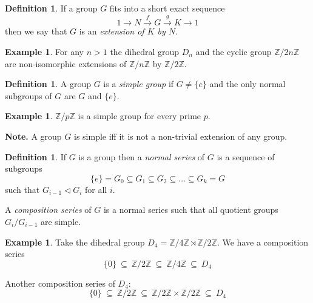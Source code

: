 \documentclass[12pt, letterpaper, oneside]{article}
\theoremstyle{plain}
\theoremstyle{definition}
\newtheorem{definition}[theorem]{Definition}
\newtheorem{example}[theorem]{Example}
\newcommand{\lra}{\longrightarrow}
\newcommand{\Z}{{\mathbb Z}}
\newcommand{\vs}{\vskip 5mm}
\begin{document}
\vs\vs 

\begin{definition}
If a group $G$ fits into a short exact sequence 
$$ 1\lra N \overset{f}{\lra} G \overset{g}{\lra} K \lra 1$$
then we say that $G$ is an \emph{extension of $K$ by $N$}.
\end{definition}


\vs\vs

\begin{example}
For any $n>1$ the dihedral group $D_{n}$ and the cyclic group $\Z/2n\Z$ are 
non-isomorphic extensions of $\Z/n\Z$ by $\Z/2\Z$.
\end{example}


\vs\vs

\begin{definition}
A group $G$ is a \emph{simple group} if $G\neq \{e\}$ and the only normal subgroups of $G$
are $G$ and $\{e\}$.
\end{definition}

\vs

\begin{example}
$\Z/p\Z$ is a simple group for every prime $p$.
\end{example}


\textbf{Note.} A group $G$ is simple iff it is not a non-trivial extension of any  group. 



\vs\vs

\begin{definition}
If $G$ is a group then a \emph{normal series} of $G$ is a sequence of subgroups
$$\{e\} = G_{0} \subseteq G_{1} \subseteq G_{2} \subseteq {\dots}\subseteq G_{k} = G$$
such that $G_{i-1}\lhd G_{i}$ for all $i$.

A \emph{composition series} of $G$ is a normal series such that all quotient groups 
$G_{i}/G_{i-1}$ are simple.
\end{definition}

\vs\vs

\begin{example}
Take the dihedral group $D_{4} = \Z/4\Z \rtimes \Z/2\Z$.
We have a composition series
$$\{0\}\ \subseteq\  \Z/2\Z \ \subseteq\  \Z/4\Z \ \subseteq\  D_{4}$$

Another composition series of $D_{4}$: 
$$\{0\}\ \subseteq\  \Z/2\Z \ \subseteq\  \Z/2\Z  \times \Z/2\Z \ \subseteq\  D_{4}$$  

\end{example}


\vs\vs
\end{document}
